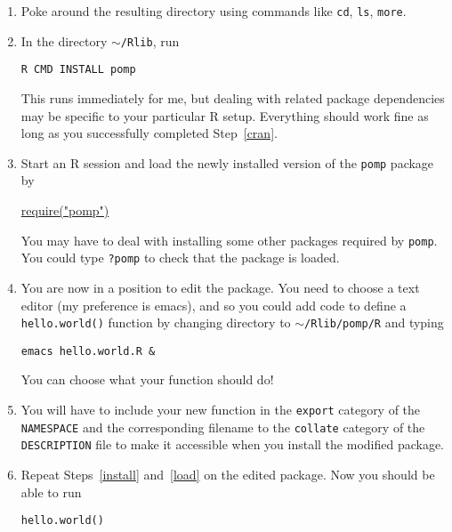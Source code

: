 \documentclass[12pt]{article}
\begin{document}
\begin{enumerate}
\item Poke around the resulting directory using commands like \texttt{cd}, \texttt{ls}, \texttt{more}.

\item \label{install} In the directory \texttt{$\sim$/Rlib}, run
\begin{verbatim}R CMD INSTALL pomp\end{verbatim}
This runs immediately for me, but dealing with related package dependencies may be specific to your particular R setup. Everything should work fine as long as you successfully completed Step~\ref{cran}.

\item \label{load} Start an R session and load the newly installed version of the \texttt{pomp} package by  

\url{require("pomp")}

You may have to deal with installing some other packages required by \texttt{pomp}. You could type \texttt{?pomp} to check that the package is loaded.
\item You are now in a position to edit the package. You need to choose a text editor (my preference is emacs), and so you could add code to define a \texttt{hello.world()} function by changing directory to \texttt{$\sim$/Rlib/pomp/R} and typing
\begin{verbatim}emacs hello.world.R &\end{verbatim}
You can choose what your function should do!

\item You will have to include your new function in the \texttt{export} category of the  \texttt{NAMESPACE} and the corresponding filename to the \texttt{collate} category of the  \texttt{DESCRIPTION} file to make it accessible when you install the modified package.

\item Repeat Steps~\ref{install} and~\ref{load} on the edited package. Now you should be able to run
\begin{verbatim}hello.world()\end{verbatim}

\end{enumerate}
\end{document}
